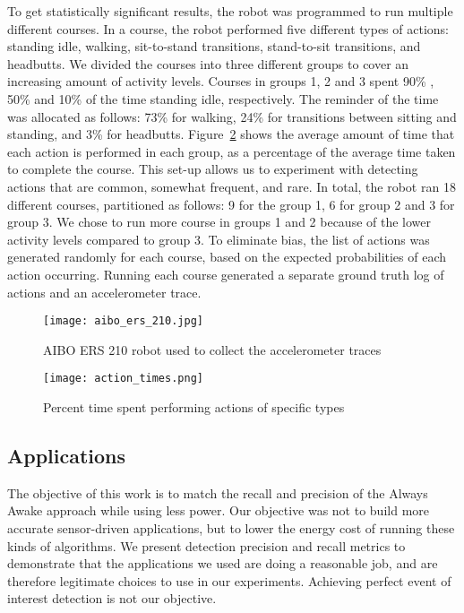 To get statistically significant results, the robot was programmed to run multiple different 
courses. In a course, the robot performed five different types of actions: standing idle, 
walking, sit-to-stand transitions, stand-to-sit transitions, and headbutts. We divided the 
courses into three different groups to cover an increasing amount of activity levels. Courses in 
groups 1, 2 and 3 spent 90\% , 50\% and 10\% of the time standing idle, respectively. The 
reminder of the time was allocated as follows: 73\% for walking, 24\% for transitions between 
sitting and standing, and 3\% for headbutts. Figure~\ref{fig:actionTimes} shows the average 
amount of time that each action is performed in each group, as a percentage of the average time 
taken to complete the course. This set-up allows us to experiment with detecting actions that 
are common, somewhat frequent, and rare. In total, the robot ran 18 different courses, 
partitioned as follows: 9 for the group 1, 6 for group 2 and 3 for group 3. We chose to run more 
course in groups 1 and 2 because of the lower activity levels compared to group 3. To eliminate 
bias, the list of actions was generated randomly for each course, based on the expected 
probabilities of each action occurring. Running each course generated a separate ground truth 
log of actions and an accelerometer trace.  

\begin{figure}[t]
	\texttt{[image: aibo\_ers\_210.jpg]}
	\caption{AIBO ERS 210 robot used to collect the accelerometer traces}
	\label{fig:aibo}
\end{figure}

\begin{figure}[t]
	\texttt{[image: action\_times.png]}
	\caption{Percent time spent performing actions of specific types}
	\label{fig:actionTimes}
\end{figure}

\subsection{Applications}

The objective of this work is to match the recall and precision of the Always Awake approach while using less power. Our objective was not to build more accurate sensor-driven applications, but to lower the energy cost of running these kinds of algorithms. We present detection precision and recall metrics to demonstrate that the applications we used are doing a reasonable job, and are therefore legitimate choices to use in our experiments. Achieving perfect event of interest detection is not our objective. 


